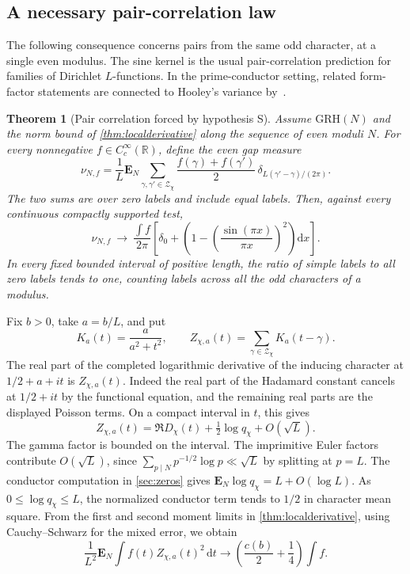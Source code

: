 \documentclass[11pt,a4paper]{article}
\numberwithin{equation}{section}
\newtheorem{theorem}{Theorem}[section]
\newcommand{\grh}{\mathrm{GRH}}
\newcommand{\ud}{\mathrm d}
\begin{document}
\subsection{A necessary pair-correlation law}

The following consequence concerns pairs from the same odd
character, at a single even modulus. The sine kernel is the
usual pair-correlation prediction for families of Dirichlet
$L$-functions. In the prime-conductor setting, related
form-factor statements are connected to Hooley's variance
by~\cite{TZLiu}.

\begin{theorem}[Pair correlation forced by hypothesis S]
\label{thm:necessarypair}
Assume $\grh(N)$ and the norm bound of \cref{thm:localderivative}
along the sequence of even moduli $N$. For every nonnegative
$f\in C_c^\infty(\mathbb R)$, define the even gap measure
\[
 \nu_{N,f}=\frac1L\mathbf E_N
     \sum_{\gamma,\gamma'\in\mathcal Z_\chi}
          \frac{f(\gamma)+f(\gamma')}{2}\,
          \delta_{L(\gamma'-\gamma)/(2\pi)} .
\]
The two sums are over zero labels and include equal labels.
Then, against every continuous compactly supported test,
\begin{equation}
 \nu_{N,f}\ \longrightarrow\
 \frac{\int f}{2\pi}
 \left[\delta_0+
       \left(1-\left(\frac{\sin(\pi x)}{\pi x}\right)^2\right)
                      \ud x\right].
 \label{eq:necessarypair}
\end{equation}
In every fixed bounded interval of positive length, the
ratio of simple labels to all zero labels tends to one,
counting labels across all the odd characters of a modulus.
\end{theorem}

Fix $b>0$, take $a=b/L$, and put
\[
 K_a(t)=\frac{a}{a^2+t^2},\qquad
 Z_{\chi,a}(t)=\sum_{\gamma\in\mathcal Z_\chi}K_a(t-\gamma).
\]
The real part of the completed logarithmic derivative of
the inducing character at $1/2+a+it$ is $Z_{\chi,a}(t)$.
Indeed the real part of the Hadamard constant cancels at
$1/2+it$ by the functional equation, and the remaining
real parts are the displayed Poisson terms. On a compact
interval in $t$, this gives
\[
 Z_{\chi,a}(t)=\Re D_\chi(t)+\tfrac12\log q_\chi+O(\sqrt L).
\]
The gamma factor is bounded on the interval.
The imprimitive Euler factors contribute $O(\sqrt L)$,
since $\sum_{p\mid N}p^{-1/2}\log p\ll\sqrt L$ by
splitting at $p=L$.
The conductor computation in \cref{sec:zeros} gives
$\mathbf E_N\log q_\chi=L+O(\log L)$. As
$0\le\log q_\chi\le L$, the normalized conductor term
tends to $1/2$ in character mean square. From the
first and second moment limits in \cref{thm:localderivative},
using Cauchy--Schwarz for the mixed error, we obtain
\begin{equation}
 \frac1{L^2}\mathbf E_N\int f(t)Z_{\chi,a}(t)^2\,\ud t
       \longrightarrow \left(\frac{c(b)}2+\frac14\right)\int f .
 \label{eq:poissonzsquare}
\end{equation}
\end{document}
